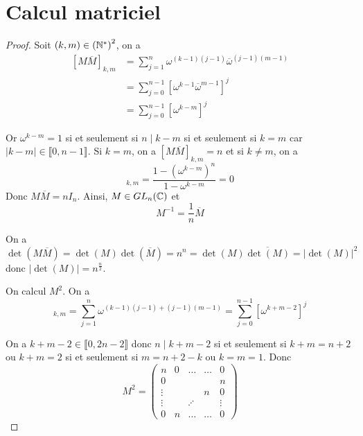 \section{Calcul matriciel}

\begin{proof}
    Soit $(k,m)\in\left(\mathbb{N}^{*}\right)^{2}$, on a 
    \begin{align}
        \left[M\overline{M}\right]_{k,m}
        &=\sum_{j=1}^{n}\omega^{(k-1)(j-1)}\overline{\omega}^{(j-1)(m-1)}\\
        &=\sum_{j=0}^{n-1}\left[\omega^{k-1}\overline{\omega}^{m-1}\right]^{j}\\
        &=\sum_{j=0}^{n-1}\left[\omega^{k-m}\right]^{j}
    \end{align}

    Or $\omega^{k-m}=1$ si et seulement si $n\mid k-m$ si et seulement si $k=m$ car $\left\lvert k-m\right\rvert\in\llbracket0,n-1\rrbracket$. Si $k=m$, on a $[M\overline{M}]_{k,m}=n$ et si $k\neq m$, on a 
    \begin{equation}
        [M\overline{M}]_{k,m}=\frac{1-\left(\omega^{k-m}\right)^{n}}{1-\omega^{k-m}}=0
    \end{equation}
    Donc $M\overline{M}=nI_{n}$. Ainsi, $M\in GL_{n}(\mathbb{C})$ et 
    \begin{equation}
        \boxed{M^{-1}=\frac{1}{n}\overline{M}}
    \end{equation}

    On a $\det(M\overline{M})=\det(M)\det(\overline{M})=n^{n}=\det(M)\overline{\det(M)}=\left\lvert\det(M)\right\rvert^{2}$ donc $\left\lvert\det(M)\right\rvert=n^{\frac{n}{2}}$.

    On calcul $M^{2}$. On a 
    \begin{equation}
        [M^{2}]_{k,m}=\sum_{j=1}^{n}\omega^{(k-1)(j-1)+(j-1)(m-1)}=\sum_{j=0}^{n-1}\left[\omega^{k+m-2}\right]^{j}
    \end{equation}

    On a $k+m-2\in\llbracket0,2n-2\rrbracket$ donc $n\mid k+m-2$ si et seulement si $k+m=n+2$ ou $k+m=2$ si et seulement si $m=n+2-k$ ou $k=m=1$. Donc 
    \begin{equation}
        M^{2}=
        \begin{pmatrix}
            n       & 0         & \dots     & \dots & 0\\
            0       &           &           &       & n\\
            \vdots  &           &           & n     & 0\\
            \vdots  &           & \iddots   &       & \vdots\\
            0       & n         &\dots      &\dots  &0
        \end{pmatrix}
    \end{equation}


\end{proof}
